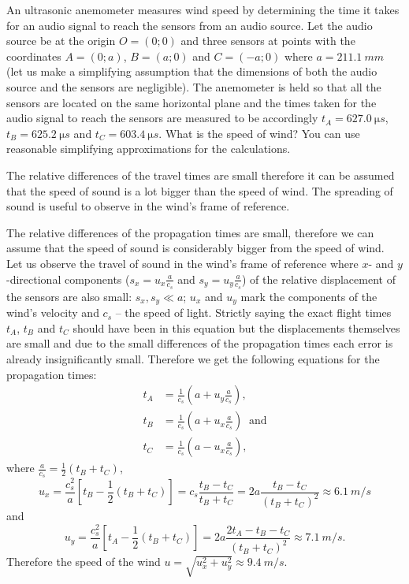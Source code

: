 {\ifEngStatement
An ultrasonic anemometer measures wind speed by determining the time it takes for an audio signal to reach the sensors from an audio source. Let the audio source be at the origin $O=(0;0)$ and three sensors at points with the coordinates $A=(0;a)$, $B=(a;0)$ and $C=(-a;0)$ where $a=\SI{211.1}{mm}$ (let us make a simplifying assumption that the dimensions of both the audio source and the sensors are negligible). The anemometer is held so that all the sensors are located on the same horizontal plane and the times taken for the audio signal to reach the sensors are measured to be accordingly $t_A=\SI{627,0}{\micro s}$, $t_B=\SI{625,2}{\micro s}$ and $t_C=\SI{603,4}{\micro s}$. What is the speed of wind? You can use reasonable simplifying approximations for the calculations.
\fi


\ifEngHint
The relative differences of the travel times are small therefore it can be assumed that the speed of sound is a lot bigger than the speed of wind. The spreading of sound is useful to observe in the wind’s frame of reference.
\fi


\ifEngSolution
The relative differences of the propagation times are small, therefore we can assume that the speed of sound is considerably bigger from the speed of wind. Let us observe the travel of sound in the wind’s frame of reference where $x$- and $y$-directional components ($s_x=u_x\frac a{c_s}$ and $s_y=u_y\frac a{c_s}$) of the relative displacement of the sensors are also small: $s_x, s_y\ll a$; $u_x$ and $u_y$ mark the components of the wind’s velocity and $c_s$ – the speed of light. Strictly saying the exact flight times $t_A$, $t_B$ and $t_C$ should have been in this equation but the displacements themselves are small and due to the small differences of the propagation times each error is already insignificantly small. Therefore we get the following equations for the propagation times:
\begin{align*}
t_A&=\frac 1{c_s}\left(a+u_y\frac a{c_s}\right),\\
t_B&=\frac 1{c_s}\left(a+u_x\frac a{c_s}\right)\;\; \mbox{and}\\
t_C&=\frac 1{c_s}\left(a-u_x\frac a{c_s}\right),
\end{align*}
where $ \frac a{c_s}=\frac 12(t_B+t_C)$,
$$u_x=\frac {c_s^2}a\left[t_B-\frac 12(t_B+t_C)\right]=c_s\frac{t_B-t_C}{t_B+t_C}=2a\frac{t_B-t_C}{(t_B+t_C)^2}\approx \SI{6.1}{m/s}$$
and
$$u_y=\frac {c_s^2}a\left[t_A-\frac 12(t_B+t_C)\right]=2a\frac{2t_A-t_B-t_C}{(t_B+t_C)^2}\approx \SI{7.1}{m/s}.$$
Therefore the speed of the wind $u=\sqrt{u_x^2+u_y^2}\approx \SI{9.4}{m/s}$.
\fi
}